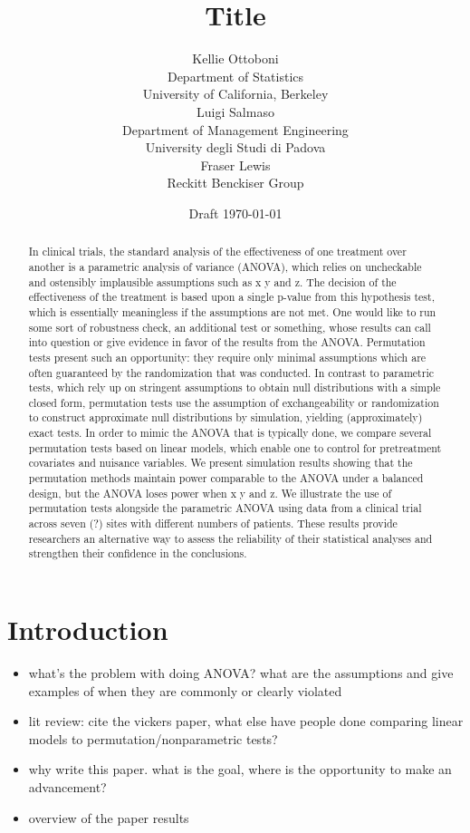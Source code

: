 \documentclass[12pt]{article}
\title{Title}
\author{Kellie Ottoboni \\
Department of Statistics\\
University of California, Berkeley\\ [.2in]
Luigi Salmaso\\
Department of Management Engineering \\
University degli Studi di Padova \\ [.2in]
Fraser Lewis \\
Reckitt Benckiser Group
}\date{Draft \today}
\newcommand{\bit}{\begin{itemize}}
\newcommand{\eit}{\end{itemize}}
\begin{document}
\maketitle

\newpage

\begin{abstract}
In clinical trials, the standard analysis of the effectiveness of one treatment over another is a parametric analysis of variance (ANOVA), which relies on uncheckable and ostensibly implausible assumptions such as x y and z.
The decision of the effectiveness of the treatment is based upon a single p-value from this hypothesis test, which is essentially meaningless if the assumptions are not met.
One would like to run some sort of robustness check, an additional test or something, whose results can call into question or give evidence in favor of the results from the ANOVA.
Permutation tests present such an opportunity: they require only minimal assumptions which are often guaranteed by the randomization that was conducted.
In contrast to parametric tests, which rely up on stringent assumptions to obtain null distributions with a simple closed form, permutation tests use the assumption of exchangeability or randomization to construct approximate null distributions by simulation, yielding (approximately) exact tests.
In order to mimic the ANOVA that is typically done, we compare several permutation tests based on linear models, which enable one to control for pretreatment covariates and nuisance variables.
We present simulation results showing that the permutation methods maintain power comparable to the ANOVA under a balanced design, but the ANOVA loses power when x y and z.
We illustrate the use of permutation tests alongside the parametric ANOVA using data from a clinical trial across seven (?) sites with different numbers of patients.
These results provide researchers an alternative way to assess the reliability of their statistical analyses and strengthen their confidence in the conclusions.


\end{abstract}

\newpage

\section{Introduction}
\bit
\item what's the problem with doing ANOVA? what are the assumptions and give examples of when they are commonly or clearly violated
\item lit review: cite the vickers paper, what else have people done comparing linear models to permutation/nonparametric tests?
\item why write this paper. what is the goal, where is the opportunity to make an advancement?
\item overview of the paper results
\eit
\end{document}
